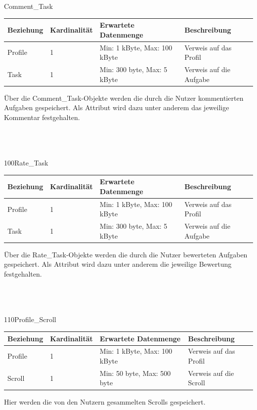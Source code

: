 \begin{entity}{90}{Comment\_Task}
\begin{center}
	\begin{longtable}{|m{4cm}|m{}|m{}|m{}|}
 	 \hline
 	 \textbf{Beziehung} & \textbf{Kardinalität} &  \textbf{Erwartete Datenmenge} & \textbf{Beschreibung} \\
  	\hline
	Profile & 1  & Min: 1  kByte, Max: 100 kByte & Verweis auf das Profil\\
	  \hline
  	Task & 1  & Min: 300 byte, Max: 5 kByte & Verweis auf die Aufgabe\\
	  \hline
	\end{longtable}
\end{center}
Über die \glqq Comment\_Task\grqq-Objekte werden die durch die Nutzer kommentierten Aufgaben gespeichert. Als Attribut wird dazu unter anderem das jeweilige Kommentar festgehalten.\\\\\\\
\end{entity}

\begin{entity}{100}{Rate\_Task}
\begin{center}
	\begin{longtable}{|m{4cm}|m{}|m{}|m{}|}
 	 \hline
 	 \textbf{Beziehung} & \textbf{Kardinalität} &  \textbf{Erwartete Datenmenge} & \textbf{Beschreibung} \\
  	\hline
	Profile & 1  & Min: 1 kByte, Max: 100 kByte & Verweis auf das Profil\\
	  \hline
  	Task & 1  & Min: 300 byte, Max: 5 kByte & Verweis auf die Aufgabe\\
	  \hline
	\end{longtable}
\end{center}
Über die \glqq Rate\_Task\grqq-Objekte werden die durch die Nutzer bewerteten Aufgaben gespeichert. Als Attribut wird dazu unter anderem die jeweilige Bewertung festgehalten.\\\\\\\
\end{entity}

\begin{entity}{110}{Profile\_Scroll}
\begin{center}
	\begin{longtable}{|m{4cm}|m{2,5cm}|m{4,5cm}|m{3,5cm}|}
 	 \hline
 	 \textbf{Beziehung} & \textbf{Kardinalität} &  \textbf{Erwartete Datenmenge} & \textbf{Beschreibung} \\
  	\hline
	Profile & 1  & Min: 1 kByte, Max: 100 kByte  & Verweis auf das Profil\\
	  \hline
  	Scroll & 1  & Min: 50 byte, Max: 500 byte & Verweis auf die Scroll\\
	  \hline
	\end{longtable}
\end{center}
Hier werden die von den Nutzern gesammelten Scrolls gespeichert.\\\\\\\
\end{entity}

